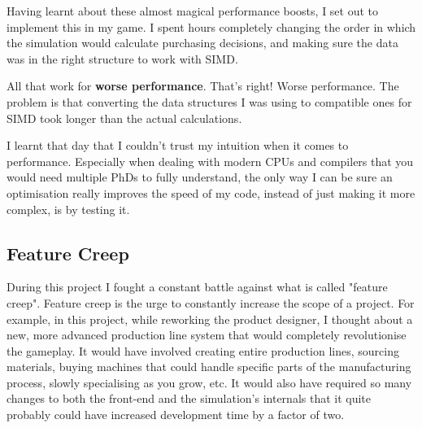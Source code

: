 Having learnt about these almost magical performance boosts, I set out to implement this in my game. I spent hours
completely changing the order in which the simulation would calculate purchasing decisions, and making sure the data was
in the right structure to work with SIMD.

All that work for \textbf{worse performance}. That's right! Worse performance. The problem is that converting the data
structures I was using to compatible ones for SIMD took longer than the actual calculations.

I learnt that day that I couldn't trust my intuition when it comes to performance. Especially when dealing with modern
CPUs and compilers that you would need multiple PhDs to fully understand, the only way I can be sure an optimisation really
improves the speed of my code, instead of just making it more complex, is by testing it.

\subsection{Feature Creep}

During this project I fought a constant battle against what is called "feature creep".
Feature creep is the urge to constantly increase the scope of a project. For example, in this project,
while reworking the product designer, I thought about a new, more advanced production line system that would completely
revolutionise the gameplay. It would have involved creating entire production lines, sourcing materials, buying machines
that could handle specific parts of the manufacturing process, slowly specialising as you grow, etc. It would also have
required so many changes to both the front-end and the simulation's internals that it quite probably could have increased
development time by a factor of two.
